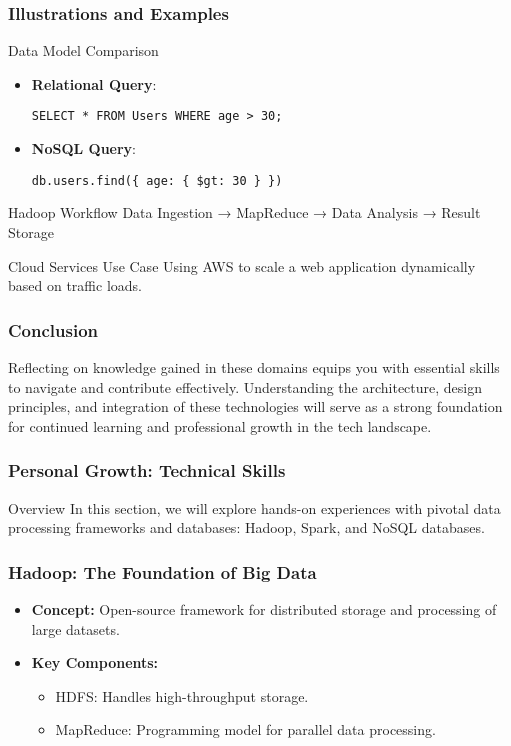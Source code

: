 \documentclass[aspectratio=169]{beamer}
\begin{document}
\begin{frame}[fragile]
    \frametitle{Illustrations and Examples}
    \begin{block}{Data Model Comparison}
        \begin{itemize}
            \item \textbf{Relational Query}: 
            \begin{lstlisting}
SELECT * FROM Users WHERE age > 30;
            \end{lstlisting}
            \item \textbf{NoSQL Query}: 
            \begin{lstlisting}
db.users.find({ age: { $gt: 30 } })
            \end{lstlisting}
        \end{itemize}
    \end{block}

    \begin{block}{Hadoop Workflow}
        Data Ingestion → MapReduce → Data Analysis → Result Storage
    \end{block}

    \begin{block}{Cloud Services Use Case}
        Using AWS to scale a web application dynamically based on traffic loads.
    \end{block}
\end{frame}

\begin{frame}[fragile]
    \frametitle{Conclusion}
    Reflecting on knowledge gained in these domains equips you with essential skills to navigate and contribute effectively. Understanding the architecture, design principles, and integration of these technologies will serve as a strong foundation for continued learning and professional growth in the tech landscape.
\end{frame}

\begin{frame}
    \frametitle{Personal Growth: Technical Skills}
    \begin{block}{Overview}
        In this section, we will explore hands-on experiences with pivotal data processing frameworks and databases: Hadoop, Spark, and NoSQL databases.
    \end{block}
\end{frame}

\begin{frame}
    \frametitle{Hadoop: The Foundation of Big Data}
    \begin{itemize}
        \item \textbf{Concept:} Open-source framework for distributed storage and processing of large datasets.
        \item \textbf{Key Components:}
        \begin{itemize}
            \item HDFS: Handles high-throughput storage.
            \item MapReduce: Programming model for parallel data processing.
        \end{itemize}
    \end{itemize}
\end{frame}
\end{document}
